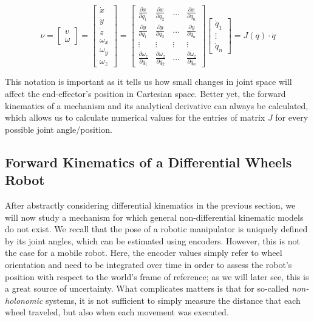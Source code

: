\begin{equation}\label{eq:kinematics:diff:fwd}
\nu = \left[\begin{array}{c}v\\\omega\end{array}\right]=
\left[\begin{array}{c}\dot{x}\\
\dot{y}\\
\dot{z}\\
\omega_x\\
\omega_y\\
\omega_z\end{array}\right]=
\left[\begin{array}{cccc}\frac{\partial{x}}{\partial{q_1}} & \frac{\partial{x}}{\partial{q_2}} & \ldots & \frac{\partial{x}}{\partial{q_n}}\\\frac{\partial{y}}{\partial{q_1}} & \frac{\partial{y}}{\partial{q_2}} & \ldots & \frac{\partial{y}}{\partial{q_n}}\\\vdots & \vdots & \vdots & \vdots\\\frac{\partial{\omega_z}}{\partial{q_1}} & \frac{\partial{\omega_z}}{\partial{q_2}} & \ldots & \frac{\partial{\omega_z}}{\partial{q_n}}\end{array}\right]\left[\begin{array}{c}\dot{q}_1\\\vdots\\\dot{q}_n\end{array}\right] = J (q) \cdot \dot{q}
\end{equation}

This notation is important as it tells us how small changes in joint space will affect the end-effector's position in Cartesian space. Better yet, the forward kinematics of a mechanism and its analytical derivative can always be calculated, which allows us to calculate numerical values for the entries of matrix $J$ for every possible joint angle/position.

\subsection{Forward Kinematics of a Differential Wheels Robot}\label{sec:kinematics:fwk:mobile}

After abstractly considering differential kinematics in the previous section, we will now study a mechanism for which general non-differential kinematic models do not exist. We recall that the pose of a robotic manipulator is uniquely defined by its joint angles, which can be estimated using encoders.
However, this is not the case for a mobile robot.
Here, the encoder values simply refer to wheel orientation and need to be integrated over time in order to assess the robot's position with respect to the world's frame of reference; as we will later see, this is a great source of uncertainty.
What complicates matters is that for so-called \textsl{non-holonomic} systems, it is not sufficient to simply measure the distance that each wheel traveled, but also when each movement was executed.

